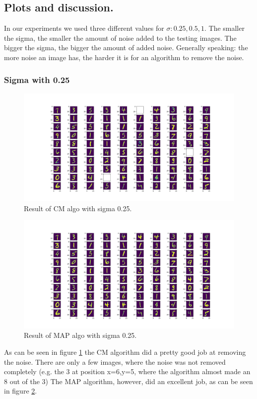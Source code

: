 \documentclass{article}
\begin{document}
\subsection{Plots and discussion.}
In our experiments we used three different values for $\sigma: 0.25, 0.5, 1$. The smaller the sigma, the smaller the amount of noise added to the testing images. The bigger the sigma, the bigger the amount of added noise. Generally speaking: the more noise an image has, the harder it is for an algorithm to remove the noise.

\subsubsection{Sigma with 0.25}
\begin{figure}[h]
  \includegraphics[width=\linewidth]{sigma_025_cm.png}
  \caption{Result of CM algo with sigma 0.25.}
  \label{fig:cm025}
\end{figure}

\begin{figure}[h]
  \includegraphics[width=\linewidth]{sigma_025_map.png}
  \caption{Result of MAP algo with sigma 0.25.}
  \label{fig:map025}
\end{figure}
As can be seen in figure \ref{fig:cm025} the CM algorithm did a pretty good job at removing the noise. There are only a few images, where the noise was not removed completely (e.g. the 3 at position x=6,y=5, where the algorithm almost made an 8 out of the 3) The MAP algorithm, however, did an excellent job, as can be seen in figure \ref{fig:map025}.
\pagebreak
\end{document}
